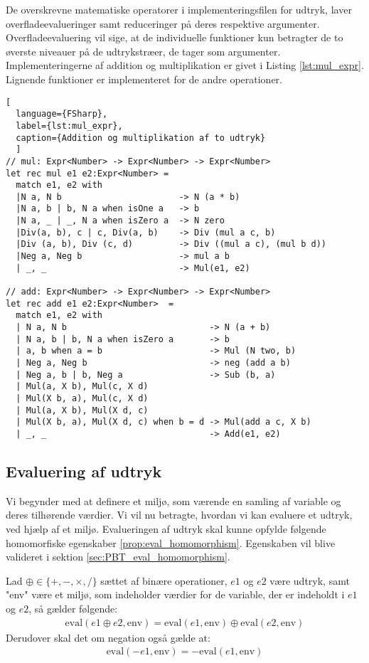 De overskrevne matematiske operatorer i implementeringsfilen for udtryk, laver overfladeevalueringer samt reduceringer på deres respektive argumenter. Overfladeevaluering vil sige, at de individuelle funktioner kun betragter de to øverste niveauer på de udtrykstræer, de tager som argumenter. Implementeringerne af addition og multiplikation er givet i Listing \ref{lst:mul_expr}. Lignende funktioner er implementeret for de andre operationer.

\begin{lstlisting}[
  language={FSharp}, 
  label={lst:mul_expr}, 
  caption={Addition og multiplikation af to udtryk}
  ]
// mul: Expr<Number> -> Expr<Number> -> Expr<Number>
let rec mul e1 e2:Expr<Number> =
  match e1, e2 with
  |N a, N b                       -> N (a * b)
  |N a, b | b, N a when isOne a   -> b
  |N a, _ | _, N a when isZero a  -> N zero
  |Div(a, b), c | c, Div(a, b)    -> Div (mul a c, b)
  |Div (a, b), Div (c, d)         -> Div ((mul a c), (mul b d))
  |Neg a, Neg b                   -> mul a b
  | _, _                          -> Mul(e1, e2)

// add: Expr<Number> -> Expr<Number> -> Expr<Number>
let rec add e1 e2:Expr<Number>  =
  match e1, e2 with
  | N a, N b                            -> N (a + b)
  | N a, b | b, N a when isZero a       -> b
  | a, b when a = b                     -> Mul (N two, b)
  | Neg a, Neg b                        -> neg (add a b) 
  | Neg a, b | b, Neg a                 -> Sub (b, a)
  | Mul(a, X b), Mul(c, X d) 
  | Mul(X b, a), Mul(c, X d)
  | Mul(a, X b), Mul(X d, c) 
  | Mul(X b, a), Mul(X d, c) when b = d -> Mul(add a c, X b)
  | _, _                                -> Add(e1, e2)

\end{lstlisting}

\subsection{Evaluering af udtryk}\label{sec:eval}
Vi begynder med at definere et miljø, som værende en samling af variable og deres tilhørende værdier. 
Vi vil nu betragte, hvordan vi kan evaluere et udtryk, ved hjælp af et miljø. Evalueringen af udtryk skal kunne opfylde følgende homomorfiske egenskaber \ref{prop:eval_homomorphism}. Egenskaben vil blive valideret i sektion \ref{sec:PBT_eval_homomorphism}.
\vspace{0.5cm}
\begin{egenskab}\label{prop:eval_homomorphism}
Lad $\oplus \in \{+, -, \times, /\}$ sættet af binære operationer, $e1$ og $e2$ være udtryk, samt "env" være et miljø, som indeholder værdier for de variable, der er indeholdt i $e1$ og $e2$, så gælder følgende:
\begin{align*}
    \text{eval}(e1 \oplus e2, \text{env}) = \text{eval}(e1, \text{env}) \oplus \text{eval}(e2, \text{env})
\end{align*}
Derudover skal det om negation også gælde at:
\begin{align*}
    \text{eval}(-e1, \text{env}) = -\text{eval}(e1, \text{env})
\end{align*}
\end{egenskab}


